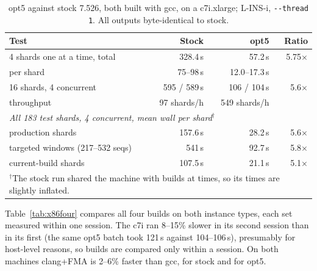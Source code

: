 \documentclass[11pt]{article}
\newcommand{\code}[1]{\texttt{#1}}
\begin{document}
\begin{table}[h]
\centering
\caption{opt5 against stock 7.526, both built with gcc, on a c7i.xlarge; L-INS-i,
\code{-{}-thread 1}. All outputs byte-identical to stock.}
\label{tab:x86}
\begin{tabular}{lrrr}
\toprule
Test & Stock & opt5 & Ratio \\
\midrule
4 shards one at a time, total & 328.4\,s & 57.2\,s & 5.75$\times$ \\
\quad per shard & 75--98\,s & 12.0--17.3\,s & \\
16 shards, 4 concurrent & 595 / 589\,s & 106 / 104\,s & 5.6$\times$ \\
\quad throughput & 97 shards/h & 549 shards/h & \\
\midrule
\multicolumn{4}{l}{\emph{All 183 test shards, 4 concurrent, mean wall per shard}$^\dagger$} \\
\quad production shards & 157.6\,s & 28.2\,s & 5.6$\times$ \\
\quad targeted windows (217--532 seqs) & 541\,s & 92.7\,s & 5.8$\times$ \\
\quad current-build shards & 107.5\,s & 21.1\,s & 5.1$\times$ \\
\bottomrule
\multicolumn{4}{l}{\footnotesize $^\dagger$The stock run shared the machine with builds at times,
so its times are slightly inflated.}
\end{tabular}
\end{table}

Table~\ref{tab:x86four} compares all four builds on both instance types, each set measured
within one session. The c7i ran 8--15\% slower in its second session than in its first (the
same opt5 batch took 121\,s against 104--106\,s), presumably for host-level reasons, so builds
are compared only within a session. On both machines clang+FMA is 2--6\% faster than gcc,
for stock and for opt5.
\end{document}
